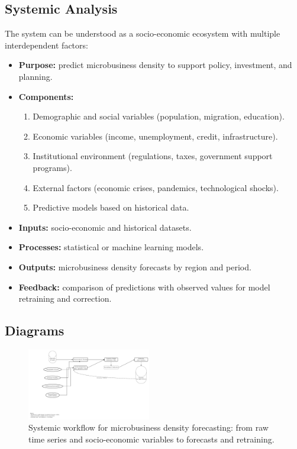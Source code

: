 \documentclass[conference]{IEEEtran}
\begin{document}
\subsection{Systemic Analysis}
The system can be understood as a socio-economic ecosystem with multiple interdependent factors:
\begin{itemize}[noitemsep]
    \item \textbf{Purpose:} predict microbusiness density to support policy, investment, and planning.
    \item \textbf{Components:}
    \begin{enumerate}[label=\alph*)]
        \item Demographic and social variables (population, migration, education).
        \item Economic variables (income, unemployment, credit, infrastructure).
        \item Institutional environment (regulations, taxes, government support programs).
        \item External factors (economic crises, pandemics, technological shocks).
        \item Predictive models based on historical data.
    \end{enumerate}
    \item \textbf{Inputs:} socio-economic and historical datasets.
    \item \textbf{Processes:} statistical or machine learning models.
    \item \textbf{Outputs:} microbusiness density forecasts by region and period.
    \item \textbf{Feedback:} comparison of predictions with observed values for model retraining and correction.
\end{itemize}

\subsection{Diagrams}

\begin{figure}[htbp]
    \centering
    \includegraphics[width=0.48\textwidth]{diagramas (1).pdf}
    \caption{Systemic workflow for microbusiness density forecasting: from raw time series and socio-economic variables to forecasts and retraining.}
    \label{fig:system_workflow}
\end{figure}
\end{document}
